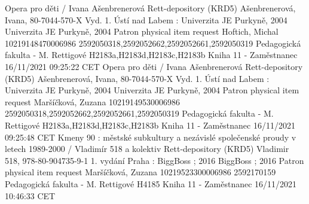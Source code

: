 \documentclass[a4paper,landscape]{article}
\begin{document}
{Opera pro děti / Ivana Ašenbrenerová	Rett-depository (KRD5)			Ašenbrenerová, Ivana,	80-7044-570-X		Vyd. 1.	Ústí nad Labem : Univerzita JE Purkyně, 2004	Univerzita JE Purkyně,	2004	Patron physical item request	Hoftich, Michal	10219148470006986	2592050318,2592052662,2592052661,2592050319						Pedagogická fakulta - M. Rettigové	H2183a,H2183d,H2183c,H2183b	Kniha						11 - Zaměstnanec	16/11/2021 09:25:22 CET
Opera pro děti / Ivana Ašenbrenerová	Rett-depository (KRD5)			Ašenbrenerová, Ivana,	80-7044-570-X		Vyd. 1.	Ústí nad Labem : Univerzita JE Purkyně, 2004	Univerzita JE Purkyně,	2004	Patron physical item request	Maršíčková, Zuzana	10219149530006986	2592050318,2592052662,2592052661,2592050319						Pedagogická fakulta - M. Rettigové	H2183a,H2183d,H2183c,H2183b	Kniha						11 - Zaměstnanec	16/11/2021 09:25:48 CET
Kmeny 90 : městské subkultury a nezávislé společenské proudy v letech 1989-2000 / Vladimír 518 a kolektiv	Rett-depository (KRD5)			Vladimir 518,	978-80-904735-9-1		1. vydání	Praha : BiggBoss ; 2016	BiggBoss ;	2016	Patron physical item request	Maršíčková, Zuzana	10219523300006986	2592170159						Pedagogická fakulta - M. Rettigové	H4185	Kniha						11 - Zaměstnanec	16/11/2021 10:46:33 CET

}
\endgroup
\end{document}
